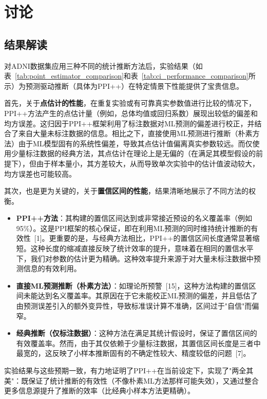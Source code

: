 \documentclass[12pt,a4paper]{article}
\begin{document}
\section{讨论}
\label{sec:discussion}

\subsection{结果解读}
\label{sec:results_interpretation}
对ADNI数据集应用三种不同的统计推断方法后，实验结果（如表~\ref{tab:point_estimator_comparison}和表~\ref{tab:ci_performance_comparison}所示）为预测驱动推断（具体为PPI++）在特定情景下性能提供了宝贵信息。

首先，关于\textbf{点估计的性能}，在重复实验或有可靠真实参数值进行比较的情况下，PPI++方法产生的点估计量（例如，总体均值或回归系数）展现出较低的偏差和均方误差。这归因于PPI++框架利用了标注数据对ML预测的偏差进行校正，并结合了来自大量未标注数据的信息。相比之下，直接使用ML预测进行推断（朴素方法）由于ML模型固有的系统性偏差，导致其点估计值偏离真实参数较远。而仅使用少量标注数据的经典方法，其点估计在理论上是无偏的（在满足其模型假设的前提下），但由于样本量小，其方差较大，从而导致单次实验中的估计值波动较大，均方误差也可能较高。

其次，也是更为关键的，关于\textbf{置信区间的性能}，结果清晰地展示了不同方法的权衡。
\begin{itemize}
    \item \textbf{PPI++方法}：其构建的置信区间达到或非常接近预设的名义覆盖率（例如95\%）。这是PPI框架的核心保证，即在利用ML预测的同时维持统计推断的有效性~{[1]}。更重要的是，与经典方法相比，PPI++的置信区间长度通常显著缩短。这种长度的缩减直接反映了统计效率的提升，意味着在相同的置信水平下，我们对参数的估计更为精确。这种效率提升来源于对大量未标注数据中预测信息的有效利用。
    \item \textbf{直接ML预测推断（朴素方法）}：如理论所预警~{[15]}，这种方法构建的置信区间未能达到名义覆盖率。其原因在于它未能校正ML预测的偏差，并且低估了由预测误差引入的额外变异性，导致标准误计算不准确，区间过于"自信"而偏窄。
    \item \textbf{经典推断（仅标注数据）}：这种方法在满足其统计假设时，保证了置信区间的有效覆盖率。然而，由于其仅依赖于少量标注数据，其置信区间长度是三者中最宽的，这反映了小样本推断固有的不确定性较大、精度较低的问题~{[7]}。
\end{itemize}
实验结果与这些预期一致，有力地证明了PPI++在当前设定下，实现了"两全其美"：既保证了统计推断的有效性（不像朴素ML方法那样可能失效），又通过整合更多信息源提升了推断的效率（比经典小样本方法更精确）。
\end{document}
